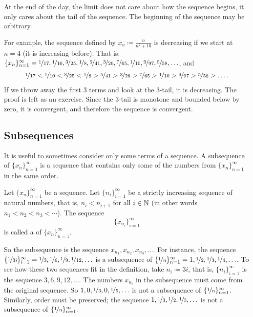 At the end of the day, the limit does not care about how the sequence begins, it only
cares about the tail of the sequence.  The beginning of the sequence
may be arbitrary.

For example, the sequence defined by $x_n \coloneqq \frac{n}{n^2+16}$ is decreasing
if we start at $n=4$ (it is increasing before).  That is:
$\{ x_n \}_{n=1}^\infty =
\nicefrac{1}{17},
\nicefrac{1}{10},
\nicefrac{3}{25},
\nicefrac{1}{8},
\nicefrac{5}{41},
\nicefrac{3}{26},
\nicefrac{7}{65},
\nicefrac{1}{10},
\nicefrac{9}{97},
\nicefrac{5}{58},\ldots$, and 
\begin{equation*}
\nicefrac{1}{17} <
\nicefrac{1}{10} <
\nicefrac{3}{25} <
\nicefrac{1}{8} >
\nicefrac{5}{41} >
\nicefrac{3}{26} >
\nicefrac{7}{65} >
\nicefrac{1}{10} >
\nicefrac{9}{97} >
\nicefrac{5}{58} > \ldots .
\end{equation*}
If we throw away the first 3 terms
and look at the 3-tail, it is decreasing.  The proof is left as an exercise.  Since the 3-tail
is monotone and bounded below by zero, it is convergent, and therefore the sequence is convergent.

\subsection{Subsequences}

It is useful to sometimes consider only some terms of a sequence.
A subsequence of $\{ x_n \}_{n=1}^\infty$ is a sequence that contains
only some of the numbers from $\{ x_n \}_{n=1}^\infty$ in the same order.

\begin{defn}
Let $\{ x_n \}_{n=1}^\infty$ be a sequence.
Let $\{ n_i \}_{i=1}^\infty$ be a strictly increasing sequence of natural
numbers, that is, $n_i < n_{i+1}$ for all $i \in {\mathbb{N}}$ (in other words $n_1 < n_2 < n_3 < \cdots$).  
The sequence
\begin{equation*}
\{ x_{n_i} \}_{i=1}^\infty
\end{equation*}
is called 
a \emph{} of $\{ x_n \}_{n=1}^\infty$.
\end{defn}

So the subsequence is the sequence $x_{n_1},x_{n_2},x_{n_3},\ldots$.
For instance,
the sequence
$\{ \nicefrac{1}{3i} \}_{i=1}^\infty
= \nicefrac{1}{3},\nicefrac{1}{6},\nicefrac{1}{9},\nicefrac{1}{12},\ldots$
is a subsequence of
$\{ \nicefrac{1}{n} \}_{n=1}^\infty
= 1, \nicefrac{1}{2},\nicefrac{1}{3},\nicefrac{1}{4},\ldots$.
To see how these two
sequences fit in the definition, take $n_i \coloneqq 3i$,
that is, $\{ n_i \}_{i=1}^\infty$ is the
sequence $3,6,9,12,\ldots$.  
The numbers $x_{n_i}$ in the
subsequence must come from the original sequence.  So $1,0,\nicefrac{1}{3},0,
\nicefrac{1}{5},\ldots$
is not a subsequence of $\{ \nicefrac{1}{n} \}_{n=1}^\infty$.  Similarly, order
must be preserved;
the sequence $1,\nicefrac{1}{3},\nicefrac{1}{2},\nicefrac{1}{5},\ldots$
is not a subsequence of $\{ \nicefrac{1}{n} \}_{n=1}^\infty$.

